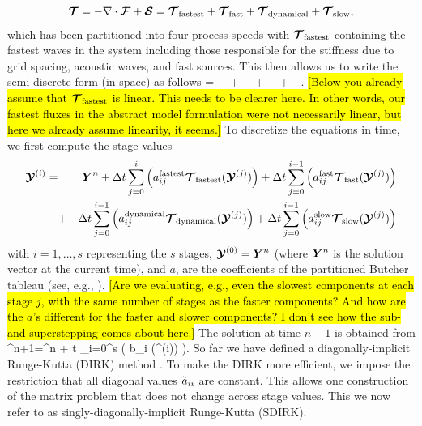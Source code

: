 \documentclass{article}
\begin{document}
\[
\boldsymbol{{\mathcal{T}}} = - \nabla \cdot \boldsymbol{{\mathcal{F}}} + \boldsymbol{{\mathcal{S}}} = \boldsymbol{{\mathcal{T}}}_{\mathrm{fastest}} + \boldsymbol{{\mathcal{T}}}_{\mathrm{fast}} + \boldsymbol{{\mathcal{T}}}_{\mathrm{dynamical}} + \boldsymbol{{\mathcal{T}}}_{\mathrm{slow}},
\]
which has been partitioned into four process speeds with $\boldsymbol{{\mathcal{T}}}_\mathrm{fastest}$ containing the fastest waves in the system including those responsible for the stiffness due to grid spacing, acoustic waves, and fast sources.  This then allows us to write the semi-discrete form (in space) as follows
\be
{} = \Tvector_ + \Tvector_ + 
\Tvector_ + \Tvector_.
\label{eq:IMEX}
\ee
\hl{[Below you already assume that $\boldsymbol{{\mathcal{T}}}_\mathrm{fastest}$ is linear. This needs to be clearer here. In other words, our fastest fluxes in the abstract model formulation were not necessarily linear, but here we already assume linearity, it seems.]} To discretize the equations in time, we first compute the stage values
\begin{eqnarray}
\boldsymbol{{\mathcal{Y}}}^{(i)}=&& \boldsymbol{{Y}}^n + \Delta t \sum_{j=0}^{i} \left( a^{\mathrm{fastest}}_{ij} \boldsymbol{{\mathcal{T}}}_{\mathrm{fastest}}(\boldsymbol{{\mathcal{Y}}}^{(j)}) \right) + \Delta t \sum_{j=0}^{i-1} \left( {a}^{\mathrm{fast}}_{ij} \boldsymbol{{\mathcal{T}}}_{\mathrm{fast}}(\boldsymbol{{\mathcal{Y}}}^{(j)}) \right) \nonumber \\
&+&  \Delta t \sum_{j=0}^{i-1} \left( {a}^{\mathrm{dynamical}}_{ij} \boldsymbol{{\mathcal{T}}}_{\mathrm{dynamical}}(\boldsymbol{{\mathcal{Y}}}^{(j)}) \right) + \Delta t \sum_{j=0}^{i-1} \left( {a}^{\mathrm{slow}}_{ij} \boldsymbol{{\mathcal{T}}}_{\mathrm{slow}}(\boldsymbol{{\mathcal{Y}}}^{(j)}) \right)
\label{eq:IMEX/stages}
\end{eqnarray}
with $i=1,\ldots,s$ representing the $s$ stages, $\boldsymbol{{\mathcal{Y}}}^{(0)}=\boldsymbol{{Y}}^n$ (where $\boldsymbol{{Y}}^n$ is the solution vector at the current time), and $a$, are the coefficients of the partitioned Butcher tableau (see, e.g., \citet{constantinescu:2007, constantinescu:2007}). \hl{[Are we evaluating, e.g., even the slowest components at each stage $j$, with the same number of stages as the faster components? And how are the $a$'s different for the faster and slower components? I don't see how the sub- and superstepping comes about here.]} 
The solution at time $n+1$ is obtained from
\be
\qvector^{n+1}=\qvector^n + \Delta t \sum_{i=0}^{s} \left( b_i (\qstage^{(i)}) \right).
\label{eq:IMEX/update}
\ee
So far we have defined a diagonally-implicit Runge-Kutta (DIRK) method \citep{alexander:1977,butcher:1981a,ascher:1997,boscarino:2009}.  To make the DIRK more efficient, we impose the restriction that all diagonal values $\widetilde{a}_{ii}$ are constant. This allows one construction of the matrix problem that does not change across stage values.  This we now refer to as singly-diagonally-implicit Runge-Kutta (SDIRK).
\end{document}
